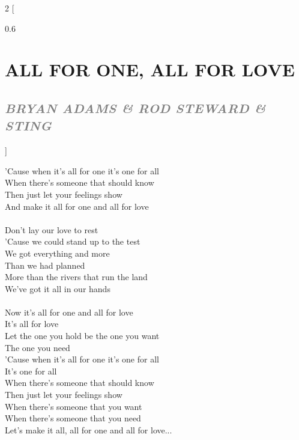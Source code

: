 \documentclass[100pt,a4paper]{report}
\newenvironment{song2}[2]
	{	
    	\begin{multicols*}{2}
		[
			\begin{spacing}{0.6}
				\section*{\LARGE\centering \MakeUppercase{\textbf{{#1}}}}
				\subsection*{\Large\centering \textit{\textcolor{gray}{\MakeUppercase{{#2}}}}}
			\end{spacing}
		]
		\Large
	}
	{
	\end{multicols*}
	\newpage
    }
\begin{document}
\begin{song2}{All for One, All for Love}{Bryan Adams \& Rod Steward \& Sting}
'Cause when it's all for one it's one for all\\
When there's someone that should know\\
Then just let your feelings show\\
And make it all for one and all for love\\
\\
Don't lay our love to rest\\
'Cause we could stand up to the test\\
We got everything and more\\ 
Than we had planned\\
More than the rivers that run the land\\
We've got it all in our hands\\
\\
Now it's all for one and all for love\\
It's all for love\\
Let the one you hold be the one you want\\
The one you need\\
'Cause when it's all for one it's one for all\\
It's one for all\\
When there's someone that should know\\
Then just let your feelings show\\
When there's someone that you want\\
When there's someone that you need\\
Let's make it all, all for one and all for love...\\
\end{song2}
\end{document}
